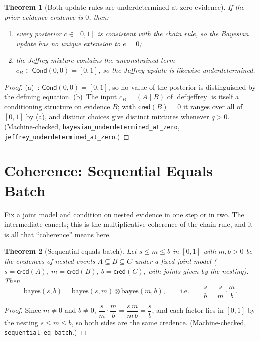\documentclass[11pt,a4paper]{article}
\newtheorem{theorem}{Theorem}[section]
\newcommand{\cred}{\mathsf{cred}}
\newcommand{\conjc}{\otimes}
\newcommand{\condc}[2]{({#1} \mid {#2})}
\newcommand{\Cond}{\mathsf{Cond}}
\begin{document}
\begin{theorem}[Both update rules are underdetermined at zero evidence]
\label{thm:update-underdetermined}
If the prior evidence credence is $0$, then:
\begin{enumerate}[label=\textup{(\alph*)},nosep]
\item every posterior $c \in [0,1]$ is consistent with the chain rule,
  so the Bayesian update has no unique extension to $e = 0$;
\item the Jeffrey mixture contains the unconstrained term
  $c_B \in \Cond(0,0) = [0,1]$, so the Jeffrey update is likewise
  underdetermined.
\end{enumerate}
\end{theorem}
\begin{proof}
(a)~: $\Cond(0,0) = [0,1]$, so no value
of the posterior is distinguished by the defining equation.
(b)~The input $c_B = \condc{A}{B}$ of \cref{def:jeffrey} is itself a
conditioning structure on evidence $B$; with $\cred(B) = 0$ it ranges
over all of $[0,1]$ by (a), and distinct choices give distinct mixtures
whenever $q > 0$.
(Machine-checked, \texttt{bayesian\_underdetermined\_at\_zero},
\texttt{jeffrey\_underdetermined\_at\_zero}.)
\end{proof}

\section{Coherence: Sequential Equals Batch}
\label{sec:coherence}

Fix a joint model and condition on nested evidence in one step or in
two.
The intermediate cancels; this is the multiplicative coherence of the
chain rule, and it is all that ``coherence'' means here.

\begin{theorem}[Sequential equals batch]
\label{thm:seq-batch}
Let $s \leq m \leq b$ in $[0,1]$ with $m, b > 0$ be the credences of
nested events $A \subseteq B \subseteq C$ under a fixed joint model
($s = \cred(A)$, $m = \cred(B)$, $b = \cred(C)$, with joints given by
the nesting).
Then
\[
\mathrm{bayes}(s, b)
= \mathrm{bayes}(s, m) \conjc \mathrm{bayes}(m, b),
\qquad\text{i.e.}\qquad
\frac{s}{b} = \frac{s}{m} \cdot \frac{m}{b} .
\]
\end{theorem}
\begin{proof}
Since $m \neq 0$ and $b \neq 0$,
$\dfrac{s}{m} \cdot \dfrac{m}{b} = \dfrac{s\,m}{m\,b} = \dfrac{s}{b}$,
and each factor lies in $[0,1]$ by the nesting $s \leq m \leq b$, so
both sides are the same credence.
(Machine-checked, \texttt{sequential\_eq\_batch}.)
\end{proof}
\end{document}
